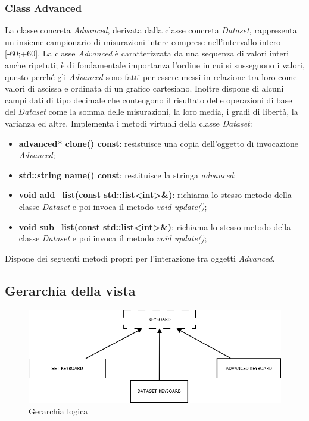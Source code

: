 \documentclass[a4paper,10pt]{article}
\begin{document}
        \subsubsection{Class Advanced}
        La classe concreta \textit{Advanced}, derivata dalla classe concreta \textit{Dataset}, rappresenta un insieme campionario di misurazioni intere comprese nell’intervallo intero [-60;+60]. La classe \textit{Advanced} è caratterizzata da una sequenza di valori interi anche ripetuti; è di fondamentale importanza l’ordine in cui si susseguono i valori, questo perché gli \textit{Advanced} sono fatti per essere messi in relazione tra loro come valori di ascissa e ordinata di un grafico cartesiano. Inoltre dispone di alcuni campi dati di tipo decimale che contengono il risultato delle operazioni di base del \textit{Dataset} come la somma delle misurazioni, la loro media, i gradi di libertà, la varianza ed altre.
        Implementa i metodi virtuali della classe \textit{Dataset}:
        \begin{itemize}
            \item \textbf{advanced* clone() const}: resistuisce una copia dell'oggetto di invocazione \textit{Advanced};
            \item \textbf{std::string name() const}: restituisce la stringa \textit{advanced};
            \item \textbf{void add\_list(const std::list<int>\&)}: richiama lo stesso metodo della classe \textit{Dataset} e poi invoca il metodo \textit{void update()};
            \item \textbf{void sub\_list(const std::list<int>\&)}: richiama lo stesso metodo della classe \textit{Dataset} e poi invoca il metodo \textit{void update()};
        \end{itemize}
        Dispone dei seguenti metodi propri per l'interazione tra oggetti \textit{Advanced}.
    
        \subsection{Gerarchia della vista}
        \begin{figure}[!h]
            \begin{center} \includegraphics[scale=0.5]{img/Diagramma2.png}
                \caption{Gerarchia logica}
            \end{center}
        \end{figure}
\end{document}
